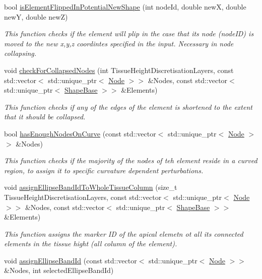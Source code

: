 \begin{DoxyCompactItemize}
\item 
bool \hyperlink{classShapeBase_a8763ab46f90adb819ec776a5829573c5}{is\+Element\+Flipped\+In\+Potential\+New\+Shape} (int node\+Id, double new\+X, double new\+Y, double new\+Z)
\begin{DoxyCompactList}\small\item\em This function checks if the element will plip in the case that its node (node\+I\+D) is moved to the new x,y,z coordintes specified in the input. Necessary in node collapsing. \end{DoxyCompactList}\item 
void \hyperlink{classShapeBase_a346f4ec76554bea282a5cab7ea28dfa2}{check\+For\+Collapsed\+Nodes} (int Tissue\+Height\+Discretisation\+Layers, const std\+::vector$<$ std\+::unique\+\_\+ptr$<$ \hyperlink{classNode}{Node} $>$$>$ \&Nodes, const std\+::vector$<$ std\+::unique\+\_\+ptr$<$ \hyperlink{classShapeBase}{Shape\+Base} $>$$>$ \&Elements)
\begin{DoxyCompactList}\small\item\em This function checks if any of the edges of the element is shortened to the extent that it should be collapsed. \end{DoxyCompactList}\item 
\hypertarget{classShapeBase_ae223927913b48f7044be8aa52a60575c}{}bool \hyperlink{classShapeBase_ae223927913b48f7044be8aa52a60575c}{has\+Enough\+Nodes\+On\+Curve} (const std\+::vector$<$ std\+::unique\+\_\+ptr$<$ \hyperlink{classNode}{Node} $>$ $>$ \&Nodes)\label{classShapeBase_ae223927913b48f7044be8aa52a60575c}

\begin{DoxyCompactList}\small\item\em This function checks if the majority of the nodes of teh element reside in a curved region, to assign it to specific curvature dependent perturbations. \end{DoxyCompactList}\item 
\hypertarget{classShapeBase_abf53d1dd8f8707d05c6a252b94093282}{}void \hyperlink{classShapeBase_abf53d1dd8f8707d05c6a252b94093282}{assign\+Ellipse\+Band\+Id\+To\+Whole\+Tissue\+Column} (size\+\_\+t Tissue\+Height\+Discretisation\+Layers, const std\+::vector$<$ std\+::unique\+\_\+ptr$<$ \hyperlink{classNode}{Node} $>$$>$ \&Nodes, const std\+::vector$<$ std\+::unique\+\_\+ptr$<$ \hyperlink{classShapeBase}{Shape\+Base} $>$$>$ \&Elements)\label{classShapeBase_abf53d1dd8f8707d05c6a252b94093282}

\begin{DoxyCompactList}\small\item\em This function assigns the marker I\+D of the apical elemetn ot all its connected elements in the tissue hight (all column of the element). \end{DoxyCompactList}\item 
\hypertarget{classShapeBase_afcdcb7ee31af4717efbd5b3c99698218}{}void \hyperlink{classShapeBase_afcdcb7ee31af4717efbd5b3c99698218}{assign\+Ellipse\+Band\+Id} (const std\+::vector$<$ std\+::unique\+\_\+ptr$<$ \hyperlink{classNode}{Node} $>$$>$ \&Nodes, int selected\+Ellipse\+Band\+Id)\label{classShapeBase_afcdcb7ee31af4717efbd5b3c99698218}


\end{DoxyCompactItemize}
